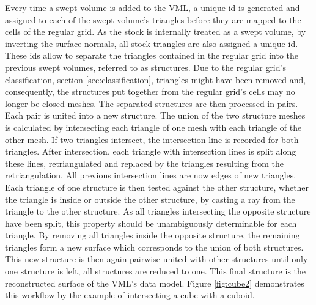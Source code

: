 Every time a swept volume is added to the VML, a unique id is generated and assigned to each of the swept volume's triangles before they are mapped to the cells of the regular grid.
As the stock is internally treated as a swept volume, by inverting the surface normals, all stock triangles are also assigned a unique id.
These ids allow to separate the triangles contained in the regular grid into the previous swept volumes, referred to as structures.
Due to the regular grid's classification, \cf section \ref{sec:classification}, triangles might have been removed and, consequently, the structures put together from the regular grid's cells may no longer be closed meshes.
The separated structures are then processed in pairs.
Each pair is united into a new structure.
The union of the two structure meshes is calculated by intersecting each triangle of one mesh with each triangle of the other mesh.
If two triangles intersect, the intersection line is recorded for both triangles.
After intersection, each triangle with intersection lines is split along these lines, retriangulated and replaced by the triangles resulting from the retriangulation.
All previous intersection lines are now edges of new triangles.
Each triangle of one structure is then tested against the other structure, whether the triangle is inside or outside the other structure, \eg by casting a ray from the triangle to the other structure.
As all triangles intersecting the opposite structure have been split, this property should be unambiguously determinable for each triangle.
By removing all triangles inside the opposite structure, the remaining triangles form a new surface which corresponds to the union of both structures.
This new structure is then again pairwise united with other structures until only one structure is left, \ie all structures are reduced to one.
This final structure is the reconstructed surface of the VML's data model.
Figure \ref{fig:cube2} demonstrates this workflow by the example of intersecting a cube with a cuboid.

